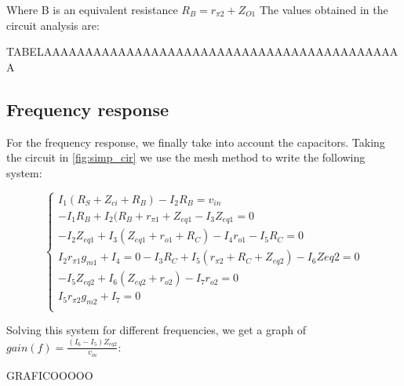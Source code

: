 Where B is an equivalent resistance $R_B=r_{\pi 2} + Z_{O1}$
The values obtained in the circuit analysis are:

TABELAAAAAAAAAAAAAAAAAAAAAAAAAAAAAAAAAAAAAAAAAAAA

\subsection{Frequency response}
For the frequency response, we finally take into account the capacitors. Taking the circuit in \ref{fig:simp_cir} we use the mesh method to write the following system:

\begin{equation}\label{eq:freq}
\begin{cases}
I_1 (R_S+Z_{ci}+R_B) - I_2 R_B = v_{in}\\
-I_1 R_B +I_2 (R_B+r_{\pi 1} + Z_{eq1} -I_3 Z_{eq1} = 0\\
-I_2 Z_{eq1} + I_3 (Z_{eq1} + r_{o1} + R_C) -I_4 r_{o1} - I_5 R_C =0\\
I_2 r_{\pi 1} g_{m1} + I_4 = 0
-I_3 R_C + I_5 (r_{\pi 2} + R_C + Z_{eq2}) - I_6 Z{eq2} = 0\\
-I_5 Z_{eq2}+ I_6 (Z_{eq2} + r_{o2}) - I_7 r_{o2} =0\\
I_5 r_{\pi 2} g_{m2} +I_7 = 0\\
\end{cases}
\end{equation}

Solving this system for different frequencies, we get a graph of $gain(f)= \frac{(I_6 - I_5) Z_{eq2}}{v_{in}}$:

GRAFICOOOOO




